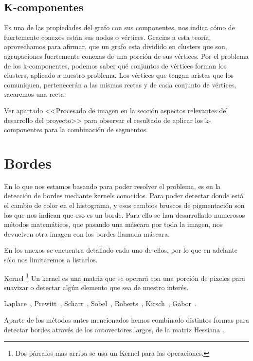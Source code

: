 \subsection{K-componentes}
Es una de las propiedades del grafo con sus componentes, nos indica cómo de fuertemente conexos están sus nodos o vértices.
Gracias a esta teoría, aprovechamos para afirmar, que un grafo esta dividido en clusters que son, agrupaciones fuertemente conexas de una porción de sus vértices.
Por el problema de los k-componentes, podemos saber qué conjuntos de vértices forman los clusters, aplicado a nuestro problema.
Los vértices que tengan aristas que los comuniquen, pertenecerán a las mismas rectas y de cada conjunto de vértices, sacaremos una recta.

Ver apartado <<Procesado de imagen en la sección aspectos relevantes del desarrollo del proyecto>> para observar el resultado de aplicar los k-componentes para la combinación de segmentos.

\section{Bordes}
En lo que nos estamos basando para poder resolver el problema,
es en la detección de bordes mediante kernels conocidos.
Para poder detectar donde está el cambio de color en el histograma, y esos cambios bruscos de pigmentación son los que nos indican que eso es un borde.
Para ello se han desarrollado numerosos métodos matemáticos, que pasando una máscara por toda la imagen, nos devuelven otra imagen con los bordes llamada máscara.

En los anexos se encuentra detallado cada uno de ellos, por lo que en adelante sólo nos limitaremos a listarlos.

Kernel \cite{wiki:kernels} \footnote{Dos párrafos mas arriba se usa un Kernel para las operaciones.} Un kernel es una matriz que se operará con una porción de pixeles para suavizar o detectar algún elemento que sea de nuestro interés.

Laplace~\cite{wiki:Laplace}, Prewitt~\cite{wiki:Prewitt}, Scharr~\cite{jon:Scharr}, Sobel~\cite{wiki:Sobel}, Roberts~\cite{wiki:Roberts}, Kirsch~\cite{wiki:Kirsch}, Gabor~\cite{wiki:Gabor}.
 
Aparte de los métodos antes mencionados hemos combinado distintos formas para detectar bordes através de los autovectores \cite{wiki:Eigenvector} largos, de la matriz Hessiana \cite{wiki:Hessiana}.